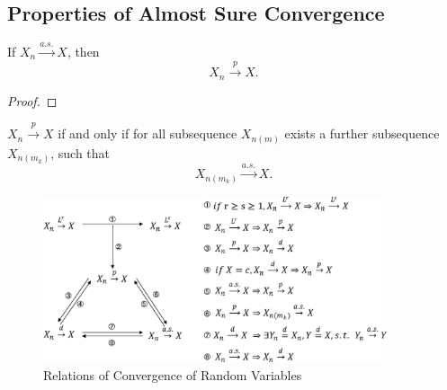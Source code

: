 \subsection{Properties of Almost Sure Convergence}

\begin{theorem}{}{}
    If $X_{n}\stackrel{a.s.}{\rightarrow}X$, then
    \begin{equation}
        X_{n}\stackrel{p}{\rightarrow}X.
    \end{equation}
\end{theorem}

\begin{proof}
    
\end{proof}

\begin{theorem}{}{}
    $X_n\stackrel{p}{\rightarrow}X$ if and only if for all subsequence $X_{n(m)}$ exists a further subsequence $X_{n(m_k)}$, such that
    \begin{equation}
        X_{n(m_k)}\stackrel{a.s.}{\rightarrow}X.
    \end{equation}
\end{theorem}


\begin{figure}[htp]
    \centering
    \includegraphics[width=0.9\textwidth]{figures/relation-of-convergences.eps}
    \caption{Relations of Convergence of Random Variables}
\end{figure}
